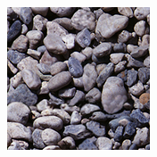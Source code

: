 \begin{figure}[]
\begin{subfigure}{\textwidth}
        \begin{subfigure}{0.19\textwidth}
            \centering
            \includegraphics[width=\textwidth]{images/04-experiment03/staircase_pebble_target.jpg}
            \caption*{}
        \end{subfigure}
        \hfill
        \begin{subfigure}{0.19\textwidth}
            \centering
\end{subfigure}
\end{subfigure}
\end{figure}
